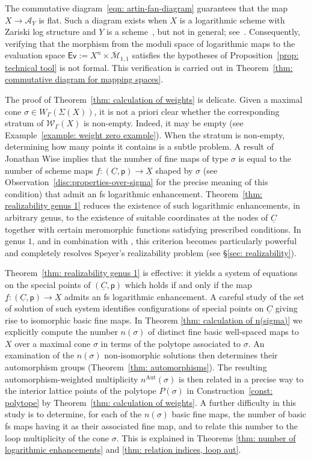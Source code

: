 \documentclass{article}
\def\cW{\mathcal{W}}
\def\oM{\overline{\mathcal{M}}}
\newcommand{\nn}{n^{\operatorname{Aut}}}
\begin{document}
The commutative diagram~\eqref{eqn: artin-fan-diagram} guarantees that the map $X \to \mathcal{A}_Y$ is flat. Such a diagram exists when $X$ is a logarithmic scheme with Zariski log structure and $Y$ is a scheme~\cite[Proposition~2.8]{ACGSI}, but not in general; see~\cite[Section~4.6.2]{ACGSI}. Consequently, verifying that the morphism from the moduli space of logarithmic maps to the evaluation space $\mathsf{Ev}:=X^n \times \oM_{1,1}$ satisfies the hypotheses of Proposition~\ref{prop: technical tool} is not formal. This verification is carried out in Theorem~\ref{thm: commutative diagram for mapping spaces}.

The proof of Theorem~\ref{thm: calculation of weights} is delicate. Given a maximal cone $\sigma \in W_{\Gamma}(\Sigma(X))$, it is not a priori clear whether the corresponding stratum of $\cW_\Gamma(X)$ is non-empty. Indeed, it may be empty (see Example~\ref{example: weight zero example}). When the stratum is non-empty, determining how many points it contains is a subtle problem. A result of Jonathan Wise \cite{Wise} implies that the number of fine maps of type $\sigma$ is equal to the number of scheme maps $f:(\underline{C},\mathsf{p}) \to \underline{X}$ shaped by $\sigma$ (see Observation~\ref{disc:properties-over-sigma} for the precise meaning of this condition) that admit an fs logarithmic enhancement. Theorem~\ref{thm: realizability genus 1} reduces the existence of such logarithmic enhancements, in arbitrary genus, to the existence of suitable coordinates at the nodes of $\underline{C}$ together with certain meromorphic functions satisfying prescribed conditions. In genus $1$, and in combination with \cite[Theorem 4.4.8]{RSWII}, this criterion becomes particularly powerful and completely resolves Speyer's realizability problem (see \S\ref{sec: realizability}).

Theorem~\ref{thm: realizability genus 1} is effective: it yields a system of equations on the special points of $(\underline{C},\mathsf{p})$ which holds if and only if the map $\underline{f}:(\underline{C},\mathsf{p}) \to \underline{X}$ admits an fs logarithmic enhancement. A careful study of the set of solution of such system identifies configurations of special points on $\underline{C}$ giving rise to isomorphic basic fine maps. In Theorem \ref{thm: calculation of n(sigma)} we explicitly compute the number $n(\sigma)$ of distinct fine basic well-spaced maps to $X$ over a maximal cone $\sigma$ in terms of the polytope associated to $\sigma$. An examination of the $n(\sigma)$ non-isomorphic solutions then determines their automorphism groups (Theorem~\ref{thm: automorphisms}). The resulting automorphism-weighted multiplicity $\nn(\sigma)$ is then related in a precise way to the interior lattice points of the polytope $P(\sigma)$ in Construction~\ref{const: polytope} by Theorem~\ref{thm: calculation of weights}. A further difficulty in this study is to determine, for each of the $n(\sigma)$ basic fine maps, the number of basic fs maps having it as their associated fine map, and to relate this number to the loop multiplicity of the cone $\sigma$. This is explained in Theorems \ref{thm: number of logarithmic enhancements} and \ref{thm: relation indices, loop aut}. 
\end{document}
